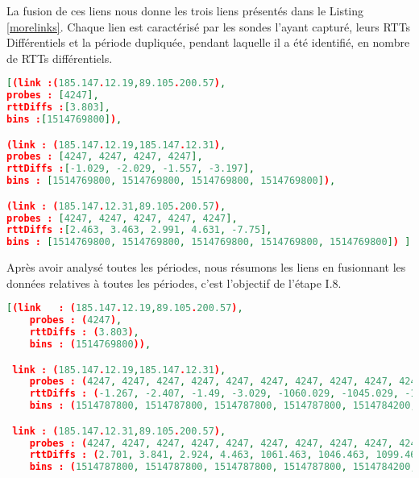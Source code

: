 La fusion de ces liens nous donne les trois liens présentés dans le Listing \ref{morelinks}. Chaque lien est caractérisé par les sondes l'ayant capturé, leurs  RTTs Différentiels et la période dupliquée, pendant laquelle il a été identifié, en nombre de RTTs différentiels. 

\begin{lstlisting}[language=json,firstnumber=1, caption={Caractérisation des liens identifiés lors  de la période 1514769800 avec les traceroutes T1, T2, T3, T4 et T5}, basicstyle = \footnotesize, label =morelinks]
[(link :(185.147.12.19,89.105.200.57),
probes : [4247],
rttDiffs :[3.803],
bins :[1514769800]),

(link : (185.147.12.19,185.147.12.31),
probes : [4247, 4247, 4247, 4247],
rttDiffs :[-1.029, -2.029, -1.557, -3.197],
bins : [1514769800, 1514769800, 1514769800, 1514769800]),

(link : (185.147.12.31,89.105.200.57),
probes : [4247, 4247, 4247, 4247, 4247],
rttDiffs :[2.463, 3.463, 2.991, 4.631, -7.75],
bins : [1514769800, 1514769800, 1514769800, 1514769800, 1514769800]) ]
\end{lstlisting}

Après avoir analysé  toutes les périodes, nous résumons les liens en fusionnant les données relatives à toutes les périodes, c'est l'objectif de l'étape I.8.

\begin{lstlisting}[language=json,firstnumber=1, caption={Illustration de l'ordre des liens}, basicstyle = \footnotesize]
[(link   : (185.147.12.19,89.105.200.57), 
    probes : (4247), 
    rttDiffs : (3.803), 
    bins : (1514769800)),  

 link : (185.147.12.19,185.147.12.31), 
    probes : (4247, 4247, 4247, 4247, 4247, 4247, 4247, 4247, 4247, 4247, 4247, 4247, 4247, 4247, 4247, 4247, 4247, 4247, 4247, 4247, 4247, 4247, 4247, 4247), 
    rttDiffs : (-1.267, -2.407, -1.49, -3.029, -1060.029, -1045.029, -1098.029, -1080.029, -680.029, -845.029, -998.029, -800.029, -1.029, -2.029, -1.557, -3.197, -1.277, -2.017, -1.257, -2.968, -0.96, -1.967, -0.987, -3.201), 
    bins : (1514787800, 1514787800, 1514787800, 1514787800, 1514784200, 1514784200, 1514784200, 1514784200, 1514780600, 1514780600, 1514780600, 1514780600, 1514769800, 1514769800, 1514769800, 1514769800, 1514773400, 1514773400, 1514773400, 1514773400, 1514777000, 1514777000, 1514777000, 1514777000)),  

 link : (185.147.12.31,89.105.200.57),
    probes : (4247, 4247, 4247, 4247, 4247, 4247, 4247, 4247, 4247, 4247, 4247, 4247, 4247, 4247, 4247, 4247, 4247, 4247, 4247, 4247, 4247, 4247, 4247, 4247, 4247),
    rttDiffs : (2.701, 3.841, 2.924, 4.463, 1061.463, 1046.463, 1099.463, 1081.463, 681.463, 846.463, 999.463, 801.463, 2.463, 3.463, 2.991, 4.631, -7.75, 2.711, 3.451, 2.691, 4.402, 2.394, 3.401, 2.421, 4.635),
    bins : (1514787800, 1514787800, 1514787800, 1514787800, 1514784200, 1514784200, 1514784200, 1514784200, 1514780600, 1514780600, 1514780600, 1514780600, 1514769800, 1514769800, 1514769800, 1514769800, 1514769800, 1514773400, 1514773400, 1514773400, 1514773400, 1514777000, 1514777000, 1514777000, 1514777000))]
\end{lstlisting}



